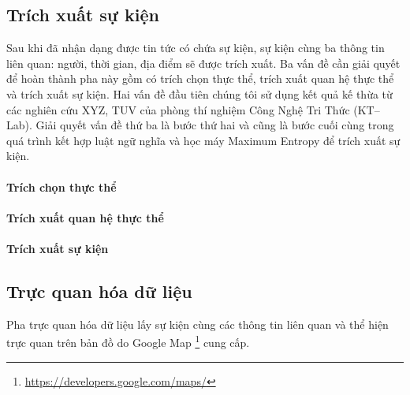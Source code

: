 \subsection{Trích xuất sự kiện}
\label{ee}
\noindent Sau khi đã nhận dạng được tin tức có chứa sự kiện, sự kiện cùng ba thông tin liên quan: người, thời gian, địa điểm sẽ được trích xuất. Ba vấn đề cần giải quyết để hoàn thành pha này gồm có trích chọn thực thể, trích xuất quan hệ thực thể và trích xuất sự kiện. Hai vấn đề đầu tiên chúng tôi sử dụng kết quả kế thừa từ các nghiên cứu XYZ, TUV  của phòng thí nghiệm Công Nghệ Tri Thức (KT--Lab). Giải quyết vấn đề thứ ba là bước thứ hai và cũng là bước cuối cùng trong quá trình kết hợp luật ngữ nghĩa và học máy Maximum Entropy để trích xuất sự kiện. \\



\paragraph{Trích chọn thực thể}



\paragraph{Trích xuất quan hệ thực thể}


\paragraph{Trích xuất sự kiện}
\noindent


\subsection{Trực quan hóa dữ liệu}
\label{vi}
\noindent Pha trực quan hóa dữ liệu lấy sự kiện cùng các thông tin liên quan và thể hiện trực quan trên bản đồ do Google Map \footnote{\href{https://developers.google.com/maps/}{https://developers.google.com/maps/}} cung cấp.







